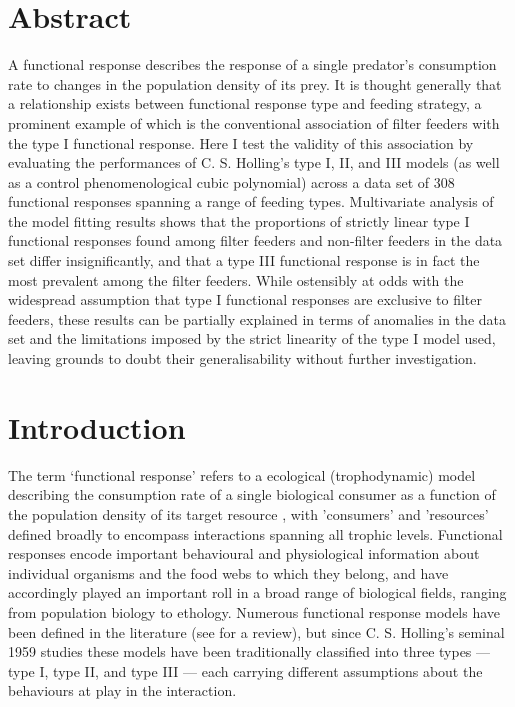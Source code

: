 \documentclass[11pt]{article}
\begin{document}
    
    \doublespacing
    
    
    \section{Abstract}
     A functional response describes the response of a single predator's consumption rate to changes in the population density of its prey. It is thought generally that a relationship exists between functional response type and feeding strategy, a prominent example of which is the conventional association of filter feeders with the type I functional response. Here I test the validity of this association by evaluating the performances of C. S. Holling's type I, II, and III models (as well as a control phenomenological cubic polynomial) across a data set of 308 functional responses spanning a range of feeding types. Multivariate analysis of the model fitting results shows that the proportions of strictly linear type I functional responses found among filter feeders and non-filter feeders in the data set differ insignificantly, and that a type III functional response is in fact the most prevalent among the filter feeders. While ostensibly at odds with the widespread assumption that type I functional responses are exclusive to filter feeders, these results can be partially explained in terms of anomalies in the data set and the limitations imposed by the strict linearity of the type I model used, leaving grounds to doubt their generalisability without further investigation.
    
    \newpage
    \linenumbers
    
    \section{Introduction}
    The term ‘functional response’ refers to a ecological (trophodynamic) model describing the consumption rate of a single biological consumer as a function of the population density of its target resource \citep{solomon1949natural}, with 'consumers' and 'resources' defined broadly to encompass interactions spanning all trophic levels. Functional responses encode important behavioural and physiological information about individual organisms and the food webs to which they belong, and have accordingly played an important roll in a broad range of biological fields, ranging from population biology to ethology. Numerous functional response models have been defined in the literature (see \citet{jeschke2002predator} for a review), but since C. S. Holling's seminal 1959 studies \citep{holling1959a, holling1959b} these models have been traditionally classified into three types — type I, type II, and type III — each carrying different assumptions about the behaviours at play in the interaction. 
    
\end{document}
